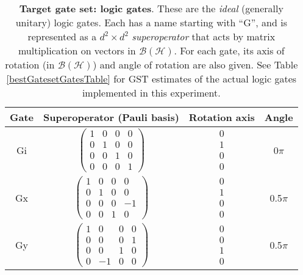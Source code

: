 \documentclass{article}[11pt]
\begin{document}
\begin{table}[h]
\begin{center}
\begin{tabular}[l]{|c|c|c|c|}
\hline
Gate & Superoperator (Pauli basis) & Rotation axis & Angle \\ \hline
Gi & $ \left(\!\!\begin{array}{cccc}
1 & 0 & 0 & 0 \\ 
0 & 1 & 0 & 0 \\ 
0 & 0 & 1 & 0 \\ 
0 & 0 & 0 & 1
 \end{array}\!\!\right) $
 & $ \begin{array}{c}
0 \\ 
1 \\ 
0 \\ 
0
 \end{array} $
 & 0$\pi$ \\ \hline
Gx & $ \left(\!\!\begin{array}{cccc}
1 & 0 & 0 & 0 \\ 
0 & 1 & 0 & 0 \\ 
0 & 0 & 0 & -1 \\ 
0 & 0 & 1 & 0
 \end{array}\!\!\right) $
 & $ \begin{array}{c}
0 \\ 
1 \\ 
0 \\ 
0
 \end{array} $
 & 0.5$\pi$ \\ \hline
Gy & $ \left(\!\!\begin{array}{cccc}
1 & 0 & 0 & 0 \\ 
0 & 0 & 0 & 1 \\ 
0 & 0 & 1 & 0 \\ 
0 & -1 & 0 & 0
 \end{array}\!\!\right) $
 & $ \begin{array}{c}
0 \\ 
0 \\ 
1 \\ 
0
 \end{array} $
 & 0.5$\pi$ \\ \hline
\end{tabular}

\caption{\textbf{Target gate set: logic gates}.  These are the \emph{ideal} (generally unitary) logic gates.  Each has a name starting with ``G'', and is represented as a $d^2\times d^2$ \emph{superoperator} that acts by matrix multiplication on vectors in $\mathcal{B}(\mathcal{H})$.  For each gate, its axis of rotation (in $\mathcal{B}(\mathcal{H})$) and angle of rotation are also given.  See Table \ref{bestGatesetGatesTable} for GST estimates of the actual logic gates implemented in this experiment.\label{targetGatesTable}}
\end{center}
\end{table}
\end{document}

